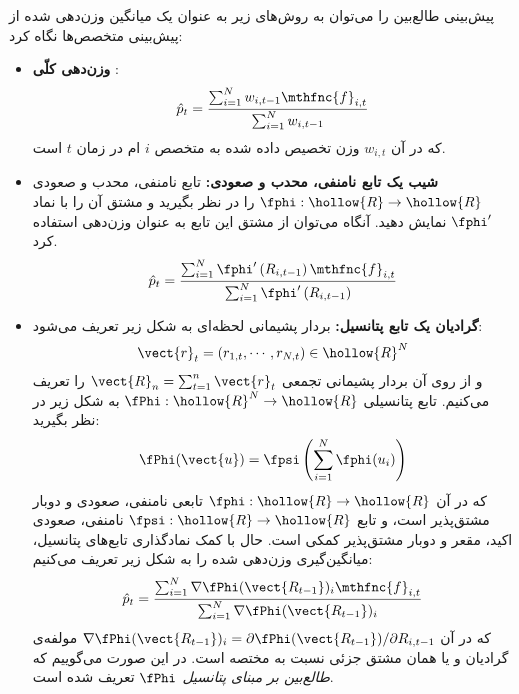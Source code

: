 
پیش‌بینی طالع‌بین را می‌توان به روش‌های زیر به عنوان یک میانگین وزن‌دهی شده
از پیش‌بینی متخصص‌ها نگاه کرد:
\begin{itemize}
\item \textbf{
وزن‌دهی کلّی
}: 
\[
\hat{p}_t = \frac{ \sum^{N}_{i=1} w_{i,t-1} \mthfnc{f}_{i,t} }{ \sum^{N}_{i=1} w_{i,t-1} }
\]
که در آن 
$w_{i,t}$ 
وزن تخصیص داده شده به متخصص 
$i$
ام در زمان 
$t$ 
است.

\item \textbf{
شیب یک تابع نامنفی، محدب و صعودی:
} 
تابع نامنفی، محدب و صعودی 
$\fphi: \hollow{R} \rightarrow \hollow{R}$ 
را در نظر بگیرید و مشتق آن را با نماد 
$\fphi^\prime$ 
نمایش دهید. آنگاه می‌توان از مشتق این تابع به عنوان وزن‌دهی استفاده کرد.
\[
\hat{p}_t = \frac{ \sum^{N}_{i=1} \fphi^\prime \left( R_{i,t-1} \right) \mthfnc{f}_{i,t} }{ \sum^{N}_{i=1} \fphi^\prime \left( R_{i,t-1} \right) }
\]

\item \textbf{
گرادیان یک تابع پتانسیل:
} 
بردار پشیمانی لحظه‌ای به شکل زیر تعریف می‌شود:
\[
\vect{r}_t = ( r_{1,t}, \cdots, r_{N,t} ) \in \hollow{R}^N
\]
و از روی آن بردار پشیمانی تجمعی 
$\vect{R}_n = \sum^{n}_{t=1} \vect{r}_t$ 
را تعریف می‌کنیم. تابع پتانسیلی 
$\fPhi : \hollow{R}^N \rightarrow \hollow{R}$ 
به شکل زیر در نظر بگیرید:
\[
\fPhi (\vect{u}) = \fpsi \left( \sum^{N}_{i=1} \fphi(u_i) \right)
\]
که در آن 
$\fphi : \hollow{R} \rightarrow \hollow{R}$ 
تابعی نامنفی، صعودی و دوبار مشتق‌پذیر است، و تابع 
$\fpsi : \hollow{R} \rightarrow \hollow{R}$ 
نامنفی، صعودی اکید، مقعر و دوبار مشتق‌پذیر کمکی
است. حال با کمک نمادگذاری تابع‌های پتانسیل، میانگین‌گیری وزن‌دهی شده را به شکل زیر تعریف می‌کنیم:
\[
\hat{p}_t = \frac{ \sum^{N}_{i=1} \nabla \fPhi( \vect{R_{t-1}} )_i \mthfnc{f}_{i,t} }{ \sum^{N}_{i=1} \nabla \fPhi (\vect{R_{t-1}})_i }
\]
که در آن 
$\nabla \fPhi( \vect{R_{t-1}} )_i = \partial \fPhi( \vect{R_{t-1}} ) / \partial R_{i,t-1}$ 
مولفه‌ی گرادیان و یا همان مشتق جزئی نسبت به مختصه است. در این صورت می‌گوییم که 
\textit{
طالع‌بین بر مبنای پتانسیل 
$\fPhi$
} 
تعریف شده است.
\end{itemize}




